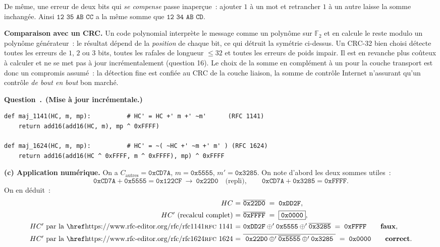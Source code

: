 \documentclass[11pt,a4paper]{article}
\renewcommand{\Q}{\medskip\par\stepcounter{qcnt}\noindent\textbf{\color{cnc}Question~\theqcnt.}~}
\begin{document}
De même, une erreur de deux bits qui \emph{se compense} passe inaperçue~: ajouter $1$ à un
mot et retrancher $1$ à un autre laisse la somme inchangée. Ainsi $\texttt{12 35 AB CC}$ a la
même somme que $\texttt{12 34 AB CD}$.

\textbf{Comparaison avec un CRC.} Un code polynomial interprète le message comme un polynôme
sur $\mathbb{F}_2$ et en calcule le reste modulo un polynôme générateur~: le résultat dépend
de la \emph{position} de chaque bit, ce qui détruit la symétrie ci-dessus. Un CRC-32 bien
choisi détecte toutes les erreurs de $1$, $2$ ou $3$ bits, toutes les rafales de longueur
$\le 32$ et toutes les erreurs de poids impair. Il est en revanche plus coûteux à calculer et
ne se met pas à jour incrémentalement (question 16). Le choix de la somme en complément à un
pour la couche transport est donc un compromis assumé~: la détection fine est confiée au
CRC de la couche liaison, la somme de contrôle Internet n'assurant qu'un contrôle
\emph{de bout en bout} bon marché.

\Q \textbf{(Mise à jour incrémentale.)}
\begin{lstlisting}
def maj_1141(HC, m, mp):          # HC' = HC +' m +' ~m'      (RFC 1141)
    return add16(add16(HC, m), mp ^ 0xFFFF)

def maj_1624(HC, m, mp):          # HC' = ~( ~HC +' ~m +' m' ) (RFC 1624)
    return add16(add16(HC ^ 0xFFFF, m ^ 0xFFFF), mp) ^ 0xFFFF
\end{lstlisting}
\textbf{(c) Application numérique.} On a $C_{\text{autres}}=\texttt{0xCD7A}$,
$m=\texttt{0x5555}$, $m'=\texttt{0x3285}$. On note d'abord les deux sommes utiles~:
\[ \texttt{0xCD7A}+\texttt{0x5555}=\texttt{0x122CF}\ \longrightarrow\ \texttt{0x22D0}
   \quad\text{(repli)},\qquad
   \texttt{0xCD7A}+\texttt{0x3285}=\texttt{0xFFFF}. \]
On en déduit~:
\[
\begin{array}{r@{\ }c@{\ }l}
HC &=& \overline{\texttt{0x22D0}} \;=\; \texttt{0xDD2F},\\[4pt]
HC'\ \text{(recalcul complet)} &=& \overline{\texttt{0xFFFF}} \;=\;
   \boxed{\texttt{0x0000}},\\[4pt]
HC'\ \text{par la \rfc{1141}} &=& \texttt{0xDD2F}\oplus'\texttt{0x5555}\oplus'
   \overline{\texttt{0x3285}} \;=\; \texttt{0xFFFF} \qquad\textbf{faux},\\[4pt]
HC'\ \text{par la \rfc{1624}} &=& \overline{\ \texttt{0x22D0}\oplus'
   \overline{\texttt{0x5555}}\oplus'\texttt{0x3285}\ } \;=\; \texttt{0x0000}
   \qquad\textbf{correct}.
\end{array}
\]
\end{document}
